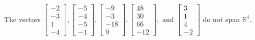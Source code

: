 \begin{exercise}
\begin{exerciseStatement}
  \end{exerciseStatement}
  \begin{exerciseAnswer}
   The vectors \(\left[\begin{array}{r}
-2 \\
-3 \\
1 \\
-4
\end{array}\right] , \left[\begin{array}{r}
-5 \\
-4 \\
-5 \\
-1
\end{array}\right] , \left[\begin{array}{r}
-9 \\
-3 \\
-18 \\
9
\end{array}\right] , \left[\begin{array}{r}
48 \\
30 \\
66 \\
-12
\end{array}\right] , \text{ and } \left[\begin{array}{r}
3 \\
1 \\
4 \\
-2
\end{array}\right]\) 
  	 do not  
	span \(\mathbb{R}^4\).
  


  \end{exerciseAnswer}
\end{exercise}